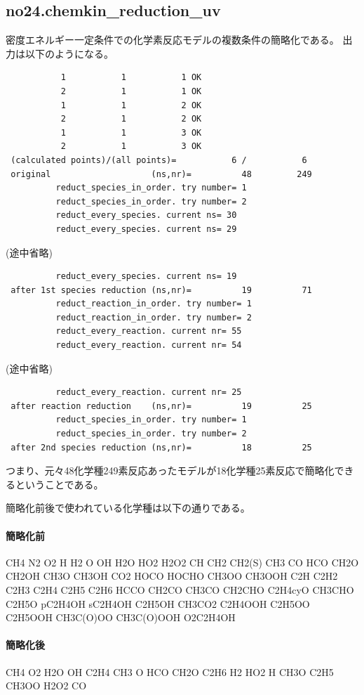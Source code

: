 \documentclass{jsarticle}
\begin{document}
\subsection{no24.chemkin\_reduction\_uv}%
密度エネルギー一定条件での化学素反応モデルの複数条件の簡略化である。
出力は以下のようになる。
\begin{verbatim}
           1           1           1 OK
           2           1           1 OK
           1           1           2 OK
           2           1           2 OK
           1           1           3 OK
           2           1           3 OK
 (calculated points)/(all points)=           6 /           6
 original                    (ns,nr)=          48         249
          reduct_species_in_order. try number= 1
          reduct_species_in_order. try number= 2
          reduct_every_species. current ns= 30
          reduct_every_species. current ns= 29
\end{verbatim}
(途中省略)
\begin{verbatim}
          reduct_every_species. current ns= 19
 after 1st species reduction (ns,nr)=          19          71
          reduct_reaction_in_order. try number= 1
          reduct_reaction_in_order. try number= 2
          reduct_every_reaction. current nr= 55
          reduct_every_reaction. current nr= 54
\end{verbatim}
(途中省略)
\begin{verbatim}
          reduct_every_reaction. current nr= 25
 after reaction reduction    (ns,nr)=          19          25
          reduct_species_in_order. try number= 1
          reduct_species_in_order. try number= 2
 after 2nd species reduction (ns,nr)=          18          25
\end{verbatim}
つまり、元々48化学種249素反応あったモデルが18化学種25素反応で簡略化できるということである。

簡略化前後で使われている化学種は以下の通りである。

\paragraph{簡略化前}
 CH4 N2 O2 H H2 O OH H2O HO2 H2O2 CH CH2
 CH2(S) CH3 CO HCO CH2O CH2OH CH3O CH3OH
 CO2 HOCO HOCHO CH3OO CH3OOH C2H C2H2
 C2H3 C2H4 C2H5 C2H6 HCCO CH2CO CH3CO
 CH2CHO C2H4cyO CH3CHO C2H5O pC2H4OH
 sC2H4OH C2H5OH CH3CO2 C2H4OOH C2H5OO
 C2H5OOH CH3C(O)OO CH3C(O)OOH O2C2H4OH

 \paragraph{簡略化後}
 CH4 O2 H2O OH C2H4 CH3 O HCO CH2O C2H6 H2
 HO2 H CH3O C2H5 CH3OO H2O2 CO
\end{document}
